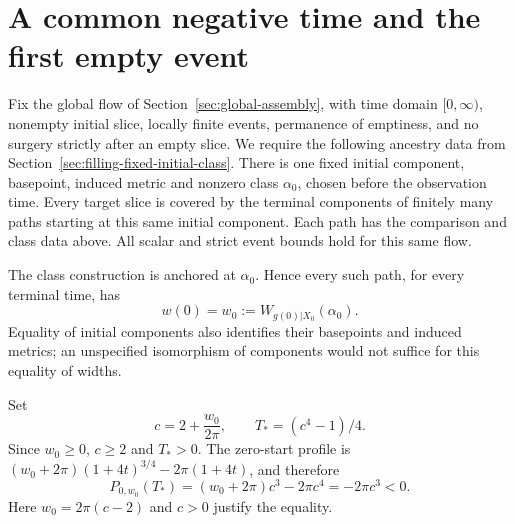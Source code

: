 \section{A common negative time and the first empty event}

Fix the global flow of Section~\ref{sec:global-assembly}, with time domain
$[0,\infty)$, nonempty initial slice, locally finite events, permanence of
emptiness, and no surgery strictly after an empty slice. We require the
following ancestry data from Section~\ref{sec:filling-fixed-initial-class}.
There is one fixed initial component, basepoint, induced metric and
nonzero class $\alpha_0$, chosen before the observation time. Every
target slice is covered by the terminal components of finitely many paths
starting at this same initial component. Each path has the comparison
and class data above. All scalar and strict event bounds hold for this
same flow.

\begin{lemma}
\label{lem:v4-common-width}
The class construction is anchored at $\alpha_0$. Hence every such
path, for every terminal time, has
\[
 w(0)=w_0:=W_{g(0)|X_0}(\alpha_0).
\]
Equality of initial components also identifies their basepoints and
induced metrics; an unspecified isomorphism of components would not
suffice for this equality of widths.
\end{lemma}

\begin{lemma}
\label{lem:v4-negative-time}
Set
\begin{equation}
 c=2+\frac{w_0}{2\pi},\qquad T_*=(c^4-1)/4.
 \label{eq:v4-extinction-time}
\end{equation}
Since $w_0\geq0$, $c\geq2$ and $T_*>0$. The zero-start profile is
$(w_0+2\pi)(1+4t)^{3/4}-2\pi(1+4t)$, and therefore
\[
 P_{0,w_0}(T_*)=(w_0+2\pi)c^3-2\pi c^4=-2\pi c^3<0.
\]
Here $w_0=2\pi(c-2)$ and $c>0$ justify the equality.
\end{lemma}

